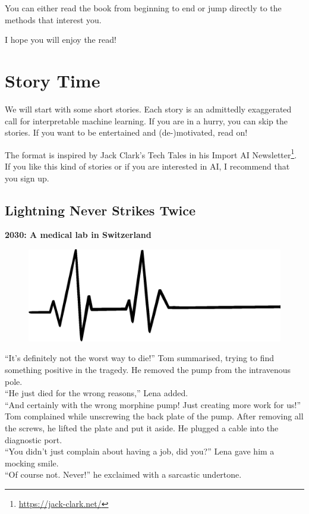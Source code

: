 \documentclass[12pt,]{krantz}
\renewcommand{\href}[2]{#2\footnote{\url{#1}}}
\begin{document}
You can either read the book from beginning to end or jump directly to
the methods that interest you.

I hope you will enjoy the read!

\newpage

\hypertarget{storytime}{\section{Story Time}\label{storytime}}

We will start with some short stories. Each story is an admittedly
exaggerated call for interpretable machine learning. If you are in a
hurry, you can skip the stories. If you want to be entertained and
(de-)motivated, read on!

The format is inspired by Jack Clark's Tech Tales in his
\href{https://jack-clark.net/}{Import AI Newsletter}. If you like this
kind of stories or if you are interested in AI, I recommend that you
sign up.

\subsection*{Lightning Never Strikes
Twice}\label{lightning-never-strikes-twice}


\textbf{2030: A medical lab in Switzerland}

\begin{figure}

{\centering \includegraphics[width=\textwidth]{images/hospital} 

}

\end{figure}

``It's definitely not the worst way to die!'' Tom summarised, trying to
find something positive in the tragedy. He removed the pump from the
intravenous pole.\\
``He just died for the wrong reasons,'' Lena added.\\
``And certainly with the wrong morphine pump! Just creating more work
for us!'' Tom complained while unscrewing the back plate of the pump.
After removing all the screws, he lifted the plate and put it aside. He
plugged a cable into the diagnostic port.\\
``You didn't just complain about having a job, did you?'' Lena gave him
a mocking smile.\\
``Of course not. Never!'' he exclaimed with a sarcastic undertone.
\end{document}
